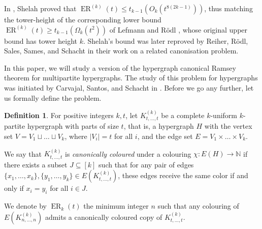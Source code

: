 \documentclass[11pt]{article}
\theoremstyle{plain}
\theoremstyle{definition}
\newtheorem{definition}{Definition}
\newcommand{\N}{\mathbb{N}}
\newcommand{\erado}[2]{\operatorname{ER}_{#1}(#2)}
\newcommand{\hyperado}[2]{\operatorname{ER}^{(#1)}(#2)}
\newcommand{\cmpltt}[3]{K^{(#1)}_{#2,\dots,#3}}
\newcommand{\cmplt}[2]{\cmpltt{#1}{#2}{#2}}
\begin{document}
In \cite{shelah1996finite}, Shelah proved that $\hyperado{k}{t}\le t_{k-1}(O_k(t^{8(2k-1)}))$, thus matching the tower-height of the corresponding lower bound $\hyperado{k}{t}\ge t_{k-1}(\Omega_k(t^2))$ of Lefmann and R\"odl \cite{lefmann1995erdHos}, whose original upper bound has tower height $k$. Shelah's bound was later reproved by Reiher, R\"odl, Sales, Sames, and Schacht \cite{reiher2022quantitative} in their work on a related canonisation problem.

In this paper, we will study a version of the hypergraph canonical Ramsey theorem for multipartite hypergraphs. The study of this problem for hypergraphs was initiated by Carvajal, Santos, and Schacht in \cite{carvajal2024canonical}. Before we go any further, let us formally define the problem. 

\begin{definition}\label{def-multierado}\sloppy
    For positive integers $k,t$, let $\cmplt{k}{t}$ be a complete $k$-uniform $k$-partite hypergraph with parts of size $t$, that is, a hypergraph $H$ with the vertex set $V=V_1\sqcup\dots\sqcup V_k$, where $|V_i|=t$ for all $i$, and the edge set $E=V_1\times\dots\times V_k$.

    We say that $\cmplt{k}{t}$ is \emph{canonically coloured} under a colouring $\chi:E(H)\to\N$ if there exists a subset $J\subseteq[k]$ such that for any pair of edges $\{x_1, \dots, x_k\},\{y_1, \dots, y_k\}\in E(\cmplt{k}{t})$, these edges receive the same color if and only if $x_i=y_i$ for all $i\in J$.
    
    We denote by $\erado{k}{t}$ the minimum integer $n$ such that any colouring of $E(\cmplt{k}{n})$ admits a canonically coloured copy of $\cmplt{k}{t}$.
\end{definition}
\end{document}
